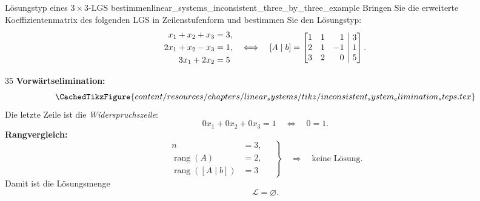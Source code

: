 \begin{ExampleBox}{Lösungstyp eines $3\times3$-LGS bestimmen}{linear_systems_inconsistent_three_by_three_example}
  Bringen Sie die erweiterte Koeffizientenmatrix des folgenden LGS in
  Zeilenstufenform und bestimmen Sie den Lösungstyp:
  \[
    \begin{aligned}
      x_1+x_2+x_3&=3,\\
      2x_1+x_2-x_3&=1,\\
      3x_1+2x_2&=5
    \end{aligned}
    \quad\Longleftrightarrow\quad
    [A\mid b]=
    \left[
      \begin{array}{@{}rrr|r@{}}
        1&1& 1&3\\
        2&1&-1&1\\
        3&2& 0&5
      \end{array}
    \right].
  \]

  \begin{ClozeArea}[32]{35}
    \textbf{Vorwärtselimination:}
    \[
      \CachedTikzFigure{content/resources/chapters/linear_systems/tikz/inconsistent_system_elimination_steps.tex}
    \]
    Die letzte Zeile ist die \emph{Widerspruchszeile}:
    \[
      0x_1+0x_2+0x_3=1
      \quad\Longleftrightarrow\quad
      0=1.
    \]
    \textbf{Rangvergleich:}
    \[
      \left.
      \begin{aligned}
        n&=3,\\[0.5em]
        \operatorname{rang}(A)&=2,\\[0.5em]
        \operatorname{rang}([A\mid b])&=3
      \end{aligned}
      \quad\right\}
      \quad\Longrightarrow\quad
      \text{keine Lösung}.
    \]
    Damit ist die Lösungsmenge
    \[
      \mathcal L=\varnothing.
    \]
  \end{ClozeArea}
\end{ExampleBox}

